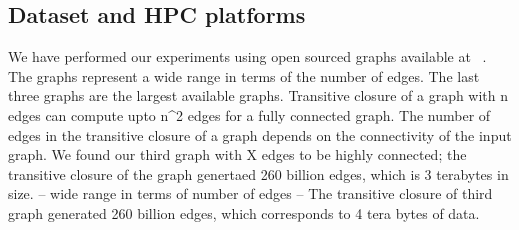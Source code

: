 

\subsection{Dataset and HPC platforms}
\label{sec:datasets}
We have performed our experiments using open sourced graphs available at ~\cite{}.
The graphs represent a wide range in terms of the number of edges. The last three graphs are the largest available graphs.
Transitive closure of a graph with n edges can compute upto n^2 edges for a fully connected graph. The number of edges in the transitive closure of a graph depends on the connectivity of the input graph. We found our third graph with X edges to be highly connected; the transitive closure of the graph genertaed 260 billion edges, which is 3 terabytes in size.
-- wide range in terms of number of edges
-- The transitive closure of third graph generated 260 billion edges, which corresponds to 4 tera bytes of data.

